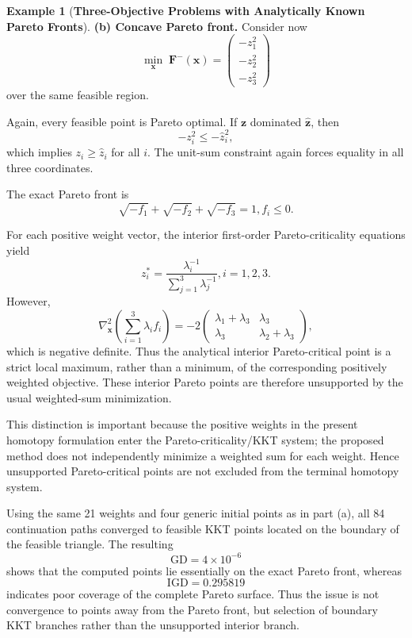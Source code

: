 \documentclass[11pt,pdflatex,sn-mathphys-ay]{sn-jnl}%
\theoremstyle{definition}
\theoremstyle{thmstyleone}%
\theoremstyle{thmstyletwo}%
\newtheorem{example}{Example}%
\theoremstyle{thmstylethree}%
\begin{document}
\begin{example}[\textbf{Three-Objective Problems with Analytically Known Pareto Fronts}]
		
		\medskip
		\noindent\textbf{(b) Concave Pareto front.}
		Consider now
		\[
		\min_{\mathbf{x}}\;
		\mathbf{F}^{-}(\mathbf{x})
		=
		\begin{pmatrix}
			-z_1^2\\
			-z_2^2\\
			-z_3^2
		\end{pmatrix}
		\]
		over the same feasible region.
		
		Again, every feasible point is Pareto optimal. If $\mathbf{z}$
		dominated $\widehat{\mathbf{z}}$, then
		\[
		-z_i^2\leq-\widehat z_i^2,
		\]
		which implies $z_i\geq\widehat z_i$ for all $i$. The unit-sum
		constraint again forces equality in all three coordinates.
		
		The exact Pareto front is
		\[\sqrt{-f_1}+\sqrt{-f_2}+\sqrt{-f_3}=1, f_i\leq0.\]
		
		For each positive weight vector, the interior first-order
		Pareto-criticality equations yield
		\[z_i^*=\frac{\lambda_i^{-1}}{\displaystyle\sum_{j=1}^{3}\lambda_j^{-1}}, i=1,2,3.\]
		However,
		\[\nabla_{\mathbf{x}}^2
		\left(
		\sum_{i=1}^{3}\lambda_i f_i
		\right)
		=
		-2
		\begin{pmatrix}
			\lambda_1+\lambda_3 & \lambda_3\\
			\lambda_3 & \lambda_2+\lambda_3
		\end{pmatrix},
		\]
		which is negative definite. Thus the analytical interior
		Pareto-critical point is a strict local maximum, rather than a
		minimum, of the corresponding positively weighted objective. These
		interior Pareto points are therefore unsupported by the usual
		weighted-sum minimization.
		
		This distinction is important because the positive weights in the
		present homotopy formulation enter the Pareto-criticality/KKT system;
		the proposed method does not independently minimize a weighted sum for
		each weight. Hence unsupported Pareto-critical points are not excluded
		from the terminal homotopy system.
		
		Using the same 21 weights and four generic initial points as in part
		(a), all 84 continuation paths converged to feasible KKT points located
		on the boundary of the feasible triangle. The resulting
		\[
		\mathrm{GD}=4\times10^{-6}
		\]
		shows that the computed points lie essentially on the exact Pareto
		front, whereas
		\[
		\mathrm{IGD}=0.295819
		\]
		indicates poor coverage of the complete Pareto surface. Thus the issue
		is not convergence to points away from the Pareto front, but selection
		of boundary KKT branches rather than the unsupported interior branch.
		

\end{example}
\end{document}
